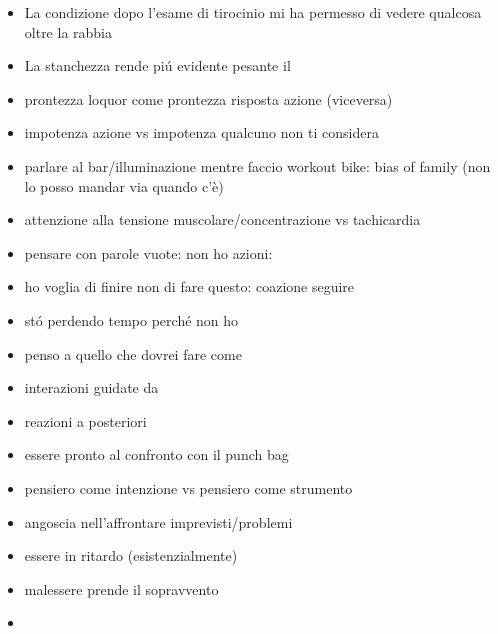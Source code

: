 \begin{itemize}

\item La condizione dopo l'esame di tirocinio mi ha permesso di vedere qualcosa oltre la rabbia

\item La stanchezza rende pi\'u evidente pesante il 

\item prontezza loquor come prontezza risposta azione (viceversa)

\item  impotenza azione vs impotenza qualcuno non ti considera

\item parlare al bar/illuminazione mentre faccio workout bike: bias of family (non lo posso mandar via quando c’è)

\item attenzione alla tensione muscolare/concentrazione vs tachicardia

\item pensare con parole vuote: non ho azioni: 

\item ho voglia di finire non di fare questo: coazione seguire

\item st\'o perdendo tempo perch\'e non ho 

\item penso a quello che dovrei fare come 

\item interazioni guidate da 

\item reazioni a posteriori

\item essere pronto al confronto con il punch bag

\item pensiero come intenzione vs pensiero come strumento

\item angoscia nell'affrontare imprevisti/problemi

\item essere in ritardo (esistenzialmente)

\item malessere prende il sopravvento

\item {} 


\end{itemize}
